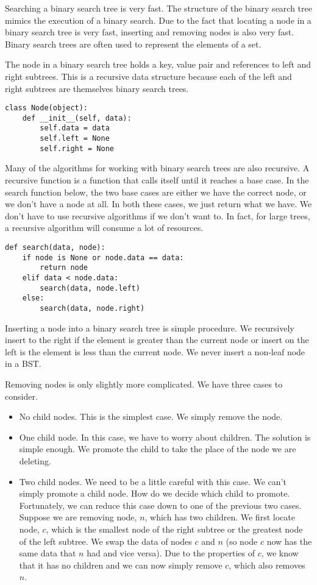 Searching a binary search tree is very fast.
The structure of the binary search tree mimics the execution of a binary search.
Due to the fact that locating a node in a binary search tree is very fast, inserting and removing nodes is also very fast.  Binary search trees are often used to represent the elements of a set.

The node in a binary search tree holds a key, value pair and references to left and right subtrees.  This is a recursive data structure because each of the left and right subtrees are themselves binary search trees.
\begin{lstlisting}
class Node(object):
    def __init__(self, data):
        self.data = data
        self.left = None
        self.right = None
\end{lstlisting}
Many of the algorithms for working with binary search trees are also recursive.
A recursive function is a function that calls itself until it reaches a base case.
In the search function below, the two base cases are either we have the correct
node, or we don't have a node at all. 
In both these cases, we just return what we have.
We don't have to use recursive algorithms if we don't want to.  In fact, for large trees, a recursive algorithm will consume a lot of resources.
\begin{lstlisting}
def search(data, node):
    if node is None or node.data == data:
        return node
    elif data < node.data:
        search(data, node.left)
    else:
        search(data, node.right)
\end{lstlisting}

Inserting a node into a binary search tree is simple procedure.
We recursively insert to the right if the element is greater than the current node
or insert on the left is the element is less than the current node.
We never insert a non-leaf node in a BST.

Removing nodes is only slightly more complicated.
We have three cases to consider.
\begin{itemize}
\item No child nodes.  This is the simplest case.  We simply remove the node.
\item One child node.  In this case, we have to worry about children.
The solution is simple enough. 
We promote the child to take the place of the node we are deleting.
\item Two child nodes.  We need to be a little careful with this case.
We can't simply promote a child node.  How do we decide which child to promote.
Fortunately, we can reduce this case down to one of the previous two cases.
Suppose we are removing node, $n$, which has two children.
We first locate node, $c$, which is the smallest node of the right subtree or the greatest node of the left subtree.  We swap the data of nodes $c$ and $n$ (so node $c$ now has the same data that $n$ had and vice versa).
Due to the properties of $c$, we know that it has no children and we can now simply remove $c$, which also removes $n$.
\end{itemize}

